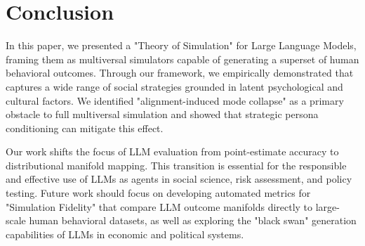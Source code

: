 \section{Conclusion}
\label{sec:conclusion}

In this paper, we presented a "Theory of Simulation" for Large Language Models, framing them as multiversal simulators capable of generating a superset of human behavioral outcomes. Through our \method framework, we empirically demonstrated that \gpt captures a wide range of social strategies grounded in latent psychological and cultural factors. We identified "alignment-induced mode collapse" as a primary obstacle to full multiversal simulation and showed that strategic persona conditioning can mitigate this effect.

Our work shifts the focus of LLM evaluation from point-estimate accuracy to distributional manifold mapping. This transition is essential for the responsible and effective use of LLMs as agents in social science, risk assessment, and policy testing. Future work should focus on developing automated metrics for "Simulation Fidelity" that compare LLM outcome manifolds directly to large-scale human behavioral datasets, as well as exploring the "black swan" generation capabilities of LLMs in economic and political systems.
